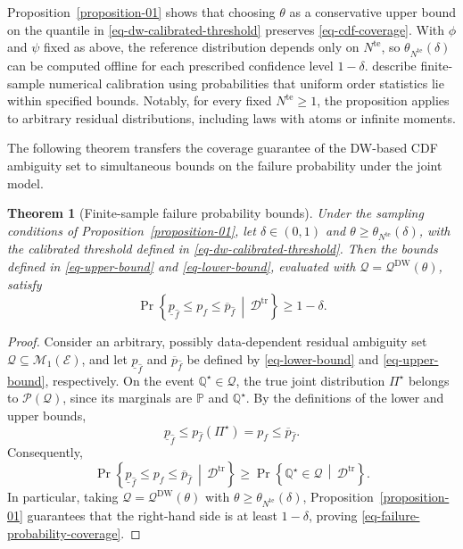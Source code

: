 \documentclass[review,11pt,3p,authoryear,nopreprintline]{elsarticle}
\newtheorem{theorem}{Theorem}
\begin{document}
Proposition~\ref{proposition-01} shows that choosing $\theta$ as a conservative upper bound on the quantile in \eqref{eq-dw-calibrated-threshold} preserves \eqref{eq-cdf-coverage}. With $\phi$ and $\psi$ fixed as above, the reference distribution depends only on $N^{\mathrm{te}}$, so $\theta_{N^{\mathrm{te}}}(\delta)$ can be computed offline for each prescribed confidence level $1-\delta$. \citet{L.J23} describe finite-sample numerical calibration using probabilities that uniform order statistics lie within specified bounds. Notably, for every fixed $N^{\mathrm{te}}\ge1$, the proposition applies to arbitrary residual distributions, including laws with atoms or infinite moments.

The following theorem transfers the coverage guarantee of the DW-based CDF ambiguity set to simultaneous bounds on the failure probability under the joint model.

\begin{theorem}[Finite-sample failure probability bounds]
  \label{theorem-01}
  Under the sampling conditions of Proposition~\ref{proposition-01}, let $\delta\in(0,1)$ and $\theta\ge\theta_{N^{\mathrm{te}}}(\delta)$, with the calibrated threshold defined in \eqref{eq-dw-calibrated-threshold}. Then the bounds defined in \eqref{eq-upper-bound} and \eqref{eq-lower-bound}, evaluated with $\mathcal Q=\mathcal Q^{\mathrm{DW}}(\theta)$, satisfy
  \begin{equation}
    \Pr\left\{\underline p_{\hat f}\le p_f\le\overline p_{\hat f}\,\middle|\,\mathcal D^{\mathrm{tr}}\right\}\ge1-\delta.
    \label{eq-failure-probability-coverage}
  \end{equation}
\end{theorem}

\begin{proof}
  Consider an arbitrary, possibly data-dependent residual ambiguity set $\mathcal Q\subseteq\mathcal M_1(\mathcal E)$, and let $\underline p_{\hat f}$ and $\overline p_{\hat f}$ be defined by \eqref{eq-lower-bound} and \eqref{eq-upper-bound}, respectively. On the event $\mathbb Q^\star\in\mathcal Q$, the true joint distribution $\Pi^\star$ belongs to $\mathcal P(\mathcal Q)$, since its marginals are $\mathbb P$ and $\mathbb Q^\star$. By the definitions of the lower and upper bounds,
  \[
    \underline p_{\hat f}
    \le p_{\hat f}(\Pi^\star)
    =p_f
    \le\overline p_{\hat f}.
  \]
  Consequently,
  \[
    \Pr\left\{
      \underline p_{\hat f}\le p_f\le\overline p_{\hat f}
      \,\middle|\,\mathcal D^{\mathrm{tr}}
    \right\}
    \ge
    \Pr\left\{
      \mathbb Q^\star\in\mathcal Q
      \,\middle|\,\mathcal D^{\mathrm{tr}}
    \right\}.
  \]
  In particular, taking $\mathcal Q=\mathcal Q^{\mathrm{DW}}(\theta)$ with $\theta\ge\theta_{N^{\mathrm{te}}}(\delta)$, Proposition~\ref{proposition-01} guarantees that the right-hand side is at least $1-\delta$, proving \eqref{eq-failure-probability-coverage}.
\end{proof}
\end{document}
